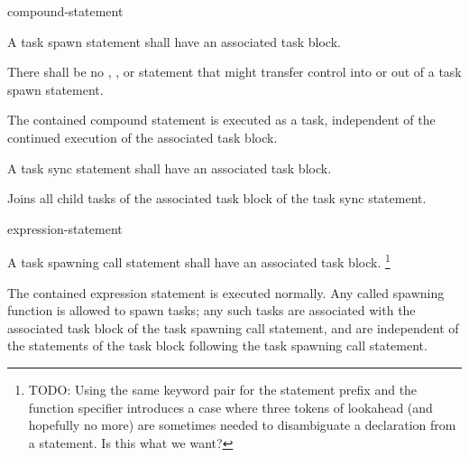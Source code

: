 
\begin{bnf}
\br
{}  compound-statement
\end{bnf}


\pnum
A task spawn statement shall have an associated task block.

\pnum
There shall be no
,
,
or
statement that might transfer control into or out of
a task spawn statement.

\pnum
The contained compound statement is executed as a task,
independent of the continued execution
of the associated task block.


\begin{bnf}
\br
{}  \terminal{;}
\end{bnf}


\pnum
A task sync statement shall have an associated task block.

\pnum
Joins all child tasks of the associated task block
of the task sync statement.

\begin{bnf}
\br
{}  expression-statement
\end{bnf}

\pnum
A task spawning call statement shall have an associated task block.
\footnote{TODO:
Using the same keyword pair
for the statement prefix and the function specifier
introduces a case where three tokens of lookahead
(and hopefully no more)
are sometimes needed
to disambiguate a declaration from a statement.
Is this what we want?
}


\pnum
The contained expression statement is executed normally.
Any called spawning function is allowed to spawn tasks;
any such tasks are associated with the associated task block
of the task spawning call statement,
and are
independent of
the statements of the task block
following the task spawning call statement.

